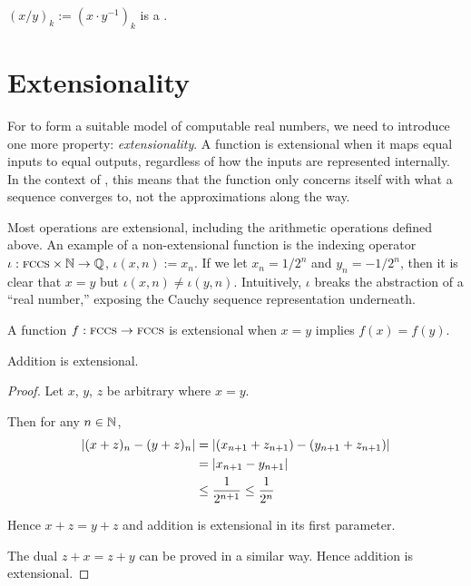 \documentclass[leqno]{report}
\begin{document}
\begin{Corollary}[Division]
    $(x/y)_k := \left(x \cdot y^{-1}\right)_k$ is a \FCCS.
\end{Corollary}

\section{Extensionality}


For \FCCS{} to form a suitable model of computable real numbers, we need to introduce one more property: \textit{extensionality}. A function is extensional when it maps equal inputs to equal outputs, regardless of how the inputs are represented internally. In the context of \FCCS, this means that the function only concerns itself with what a sequence converges to, not the approximations along the way.

Most operations are extensional, including the arithmetic operations defined above. An example of a non-extensional function is the indexing operator $\iota : \textsc{fccs} \times \mathbb{N} \rightarrow \mathbb{Q}$, $\iota(x, n) := x_n$. If we let $x_n = 1/2^n$ and $y_n = -1/2^n$, then it is clear that $x = y$ but $\iota(x, n) \neq \iota(y, n)$. Intuitively, $\iota$ breaks the abstraction of a ``real number,'' exposing the Cauchy sequence representation underneath.

\begin{Definition}[Extensionality]
    A function $f : \textsc{fccs} \rightarrow \textsc{fccs}$ is extensional when $x = y$ implies $f(x) = f(y)$.
\end{Definition}

\begin{Proposition}
    Addition is extensional.
\end{Proposition}

\begin{proof}
    Let $x$, $y$, $z$ be arbitrary \FCCS{} where $x = y$.

    Then for any $n \in \mathbb{N}$,
    \begin{align*}
        \left|  (x + z)_n - (y + z)_n  \right|
        &= \left|  (x_{n+1} + z_{n+1}) - (y_{n+1} + z_{n+1})  \right| \\
        &= \left|  x_{n+1} - y_{n+1}  \right| \\
        &\leq \frac{1}{2^{n+1}} \leq \frac{1}{2^n}
    \end{align*}

    Hence $x + z = y + z$ and addition is extensional in its first parameter.

    The dual $z + x = z + y$ can be proved in a similar way. Hence addition is extensional.
\end{proof}
\end{document}
